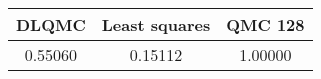 \begin{tabular}{|c|c|c|}
\hline
DLQMC&Least squares&QMC 128\\ 
\hline

0.55060 & 0.15112 & 1.00000\\ 
\hline
\end{tabular}

